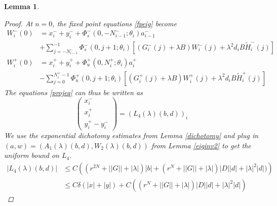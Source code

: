 \documentclass[12pt]{article}
\newtheorem{lemma}{Lemma}
\begin{document}
\begin{lemma}
\begin{proof}
At $n = 0$, the fixed point equations \eqref{fpeig} become 
\begin{align*}
W_i^-(0) &= x_i^- + y_i^- +
\Phi_s^-(0, -N_{i-1}^-; \theta_i) a_{i-1}^- \\
&+ \sum_{j = -N_{i-1}^-}^{-1} \Phi_s^-(0, j+1; \theta_i)
[(G_i^-(j) + \lambda B) W_i^-(j) + \lambda^2 d_i B \tilde{H}_i^-(j)] \\
W_i^+(0) &= x_i^+ + y_i^+ + \Phi_u^+(0, N_i^+; \theta_i) a_i^+ \\
&- \sum_{j = 0}^{N_i^+-1} \Phi_u^+(0, j+1; \theta_i) 
[(G_i^+(j) + \lambda B) W_i^+(j) + \lambda^2 d_i B \tilde{H}_i^+(j)]
\end{align*}
The equations \eqref{projeq} can thus be written as
\begin{equation}\label{projeq2}
\begin{pmatrix}
x_i^- \\ x_i^+ \\ y_i^+ - y_i^-
\end{pmatrix}
= (L_4(\lambda)(b,d))_i
\end{equation}
We use the exponential dichotomy estimates from Lemma \ref{dichotomy} and plug in $(a, w) = (A_1(\lambda)(b,d), W_2(\lambda)(b,d))$ from Lemma \ref{eiginv2} to get the uniform bound on $L_4$.
\begin{align*}
|L_4(\lambda)(b,d)| 
&\leq C \left( (r^{2N} + ||G|| + |\lambda|)|b| + 
(r^{N} + ||G|| + |\lambda|)|D| |d| + |\lambda|^2 |d| )
\right) \\
&\leq C \delta(|x| + |y|) + C \left( (r^{N} + ||G|| + |\lambda|)|D| |d| + |\lambda|^2 |d| \right)
\end{align*}


\end{proof}
\end{lemma}
\end{document}

